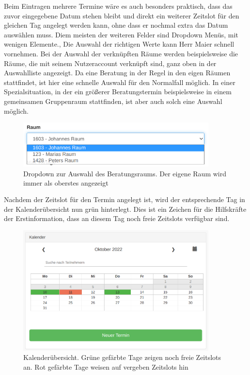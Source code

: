 \documentclass[12pt]{article}
\newcommand{\ipName}{Herr Maier }
\begin{document}
Beim Eintragen mehrere Termine wäre es auch besonders praktisch, dass das zuvor
eingegebene Datum stehen bleibt und direkt ein weiterer Zeitslot für den
gleichen Tag angelegt werden kann, ohne dass er nochmal extra das Datum
auswählen muss. Diem meisten der weiteren Felder sind Dropdown Menüs, mit
wenigen Elemente., Die Auswahl der richtigen Werte kann \ipName schnell
vornehmen. Bei der Auswahl der verknüpften Räume werden beispielsweise die
Räume, die mit seinem Nutzeraccount verknüpft sind, ganz oben in der
Auswahlliste angezeigt. Da eine Beratung in der Regel in den eigen Räumen
stattfindet, ist hier eine schnelle Auswahl für den Normalfall möglich. In
einer Spezialsituation, in der ein größerer Beratungstermin beispielsweise in
einem gemeinsamen Gruppenraum stattfinden, ist aber auch solch eine Auswahl
möglich.

\begin{figure}[h]
    \caption{Dropdown zur Auswahl des Beratungsraums. Der eigene Raum wird immer als oberstes angezeigt}
    \centering
    \includegraphics[width=0.9\textwidth]{screen_old_roomdropdown.png}
\end{figure}

Nachdem der Zeitslot für den Termin angelegt ist, wird der entsprechende Tag in
der Kalenderübersicht nun grün hinterlegt. Dies ist ein Zeichen für die
Hilfskräfte der Erstinformation, dass an diesem Tag noch freie Zeitslots
verfügbar sind.

\begin{figure}[h]
    \caption{Kalenderübersicht. Grüne gefärbte Tage zeigen noch freie Zeitslots an. Rot gefärbte Tage weisen auf vergeben Zeitslots hin}
    \centering
    \includegraphics[width=0.9\textwidth]{screen_old_module.png}
\end{figure}
\end{document}
